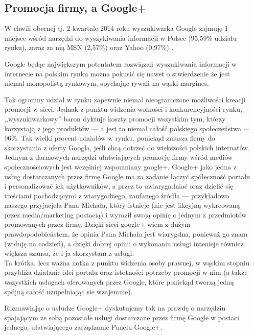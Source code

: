 
\subsection{Promocja firmy, a Google+}
W chwili obecnej tj. 2 kwartale 2014 roku wyszukiwarka Google zajmuję 1 miejsce wśród narzędzi do wyszykiwania informacji w Polsce (95,59\% udziału rynku), zaraz za nią MSN (2,57\%) oraz Yahoo (0,97\%) \cite{url:gemius-ranking-silnikow-wyszukiwarek}.

Google będąc największym potentatem rozwiązań wyszukiwania informacji w internecie na polskim rynku można pokusić się nawet o stwierdzenie że jest niemal monopolistą rynkowym, spychając rywali na wąski margines.

Tak ogromny udział w rynku zapewnie niemal nieograniczone możliwości kreacji promocji w sieci. Jednak z punktu widzenia wolności i konkurencyjności rynku, ,,wyszukiwarkowy'' baron dyktuje koszty promocji wszystkim tym, którzy korzystają z jego produktów --- a jest to niemal całość polskiego społeczeństwa $\sim$96\%. Tak wielki procent udziałów w rynku, poniekąd zmusza firmy do skorzystania z oferty Googla, jeśli chcą dotrzeć do wiekszości polskich internatów. \\


Jednym z darmowych narzędzi ułatwiających promocję firmy wśród mediów społecznościowych jest wczęśniej wspomniany google+. Google+ jako jedna z usług dostarczanych przez firmę Google ma za zadanie łączyć spółeczność portalu i personalizować ich użytkowników, a przez to uwiarygadniać oraz dzielić się treściami pochodzącymi z wiarygodnego, zaufanego źródła --- przykładowo naszego przyjacjela Pana Michała, który istnieje (nie jest fikcyjną wykreowaną przez media/marketing postacią) i wyraził swoją opinię o jednym z przedmiotów promowanych przez firmę. Dzięki sieci google+ wiem z dużym prawdopodobieństem, że opinia Pana Michała jest wiarygdna, ponieważ go znam (widuję na codzień), a dzięki dobrej opinii o wykonaniu usługi intenieje również większa szansa, że i ja skorzystam z usługi.\\

Ta krótka, lecz ważna notka z punktu widzenia osoby prawnej, w wąskim stopniu przybliża działanie idei portalu oraz istotności potrzeby promocji w nim (a także wszystkich usługach oferowanych przez Google, które poniekąd tworzą jedną spójną całość uzupełniając sie wzajemnie). 

Rozmawiając o usłudze Google+ dyskutujemy tak na prawdę o narzędziu spajającym ze sobą pozostałe usługi dostarczane przez firmę Google w postaci jednego, ułatwiającego zarządzanie Panelu Google+.

